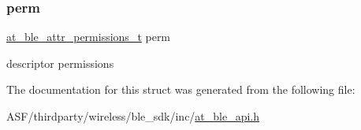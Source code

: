 \subsubsection{\texorpdfstring{perm}{perm}}
{\footnotesize\ttfamily \mbox{\hyperlink{at__ble__api_8h_a5d87cd231ea3f9e11846dba7cf75eb61}{at\+\_\+ble\+\_\+attr\+\_\+permissions\+\_\+t}} perm}

descriptor permissions 

The documentation for this struct was generated from the following file\+:\begin{DoxyCompactItemize}
\item 
A\+S\+F/thirdparty/wireless/ble\+\_\+sdk/inc/\mbox{\hyperlink{at__ble__api_8h}{at\+\_\+ble\+\_\+api.\+h}}\end{DoxyCompactItemize}

